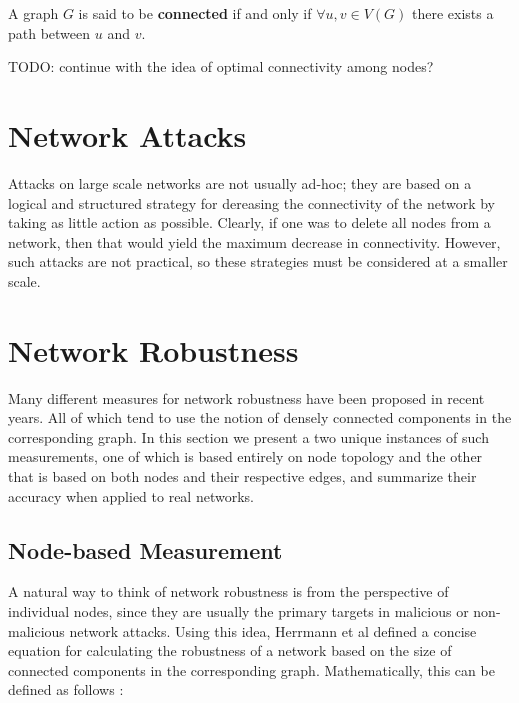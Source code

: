 \documentclass[11pt]{article}
\begin{document}
\begin{define}
A graph $G$ is said to be \textbf{connected} if and only if $\forall u,v \in V(G)$ there exists a path between $u$ and $v$.
\end{define}


TODO: continue with the idea of optimal connectivity among nodes?

\section{Network Attacks}


Attacks on large scale networks are not usually ad-hoc; they are based on a logical and structured strategy for dereasing the connectivity of the network by taking as little action as possible. Clearly, if one was to delete all nodes from a network, then that would yield the maximum decrease in connectivity. However, such attacks are not practical, so these strategies must be considered at a smaller scale.


\section{Network Robustness}

Many different measures for network robustness have been proposed in recent years. All of which tend
to use the notion of densely connected components in the corresponding graph. In this section we present
a two unique instances of such measurements, one of which is based entirely on node topology and the other that is based on both nodes and their respective edges, and summarize their accuracy when applied to real networks.

\subsection{Node-based Measurement}
A natural way to think of network robustness is from the perspective of individual nodes, since they are 
usually the primary targets in malicious or non-malicious network attacks. Using this idea, Herrmann et al
defined a concise equation for calculating the robustness of a network based on the size of connected
components in the corresponding graph. Mathematically, this can be defined as follows \cite{Onion}:
\end{document}
